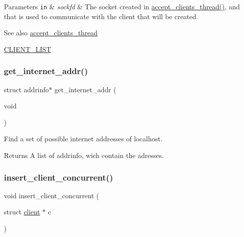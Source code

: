 \begin{DoxyParams}[1]{Parameters}
\mbox{\tt in}  & {\em sockfd} & The socket created in \hyperlink{zip-zop-server_8c_aebe94d23e0b61c3ffd1df3a19071fb4b}{accept\+\_\+clients\+\_\+thread()}, and that is used to communicate with the client that will be created.\\
\hline
\end{DoxyParams}
\begin{DoxySeeAlso}{See also}
\hyperlink{zip-zop-server_8c_aebe94d23e0b61c3ffd1df3a19071fb4b}{accept\+\_\+clients\+\_\+thread} 

\hyperlink{zip-zop-server_8c_a32076dcdfaf1057a014d74d01cc7e08e}{C\+L\+I\+E\+N\+T\+\_\+\+L\+I\+ST} 
\end{DoxySeeAlso}
\mbox{\label{zip-zop-server_8c_a2d9748875d07382b9dbecb97c6cd9b62}} 
\subsubsection{\texorpdfstring{get\+\_\+internet\+\_\+addr()}{get\_internet\_addr()}}
{\footnotesize\ttfamily struct addrinfo$\ast$ get\+\_\+internet\+\_\+addr (\begin{DoxyParamCaption}\item[{void}]{ }\end{DoxyParamCaption})}



Find a set of possible internet addresses of localhost. 

\begin{DoxyReturn}{Returns}
A list of addrinfo, wich contain the adresses. 
\end{DoxyReturn}
\mbox{\label{zip-zop-server_8c_a84f39912128d6dc7a66bbdd88fad00b5}} 
\subsubsection{\texorpdfstring{insert\+\_\+client\+\_\+concurrent()}{insert\_client\_concurrent()}}
{\footnotesize\ttfamily void insert\+\_\+client\+\_\+concurrent (\begin{DoxyParamCaption}\item[{struct \hyperlink{structclient}{client} $\ast$}]{c }\end{DoxyParamCaption})}



